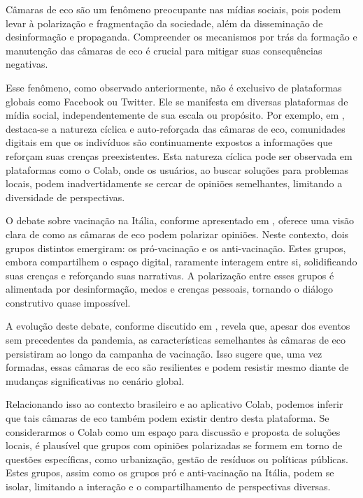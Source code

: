 Câmaras de eco são um fenômeno preocupante nas mídias sociais, pois podem levar à polarização e fragmentação da sociedade, além da disseminação de desinformação e propaganda. Compreender os mecanismos por trás da formação e manutenção das câmaras de eco é crucial para mitigar suas consequências negativas.

Esse fenômeno, como observado anteriormente, não é exclusivo de plataformas globais como Facebook ou Twitter. Ele se manifesta em diversas plataformas de mídia social, independentemente de sua escala ou propósito. Por exemplo, em , destaca-se a natureza cíclica e auto-reforçada das câmaras de eco, comunidades digitais em que os indivíduos são continuamente expostos a informações que reforçam suas crenças preexistentes. Esta natureza cíclica pode ser observada em plataformas como o Colab, onde os usuários, ao buscar soluções para problemas locais, podem inadvertidamente se cercar de opiniões semelhantes, limitando a diversidade de perspectivas.

O debate sobre vacinação na Itália, conforme apresentado em , oferece uma visão clara de como as câmaras de eco podem polarizar opiniões. Neste contexto, dois grupos distintos emergiram: os pró-vacinação e os anti-vacinação. Estes grupos, embora compartilhem o espaço digital, raramente interagem entre si, solidificando suas crenças e reforçando suas narrativas. A polarização entre esses grupos é alimentada por desinformação, medos e crenças pessoais, tornando o diálogo construtivo quase impossível.

A evolução deste debate, conforme discutido em , revela que, apesar dos eventos sem precedentes da pandemia, as características semelhantes às câmaras de eco persistiram ao longo da campanha de vacinação. Isso sugere que, uma vez formadas, essas câmaras de eco são resilientes e podem resistir mesmo diante de mudanças significativas no cenário global.

Relacionando isso ao contexto brasileiro e ao aplicativo Colab, podemos inferir que tais câmaras de eco também podem existir dentro desta plataforma. Se considerarmos o Colab como um espaço para discussão e proposta de soluções locais, é plausível que grupos com opiniões polarizadas se formem em torno de questões específicas, como urbanização, gestão de resíduos ou políticas públicas. Estes grupos, assim como os grupos pró e anti-vacinação na Itália, podem se isolar, limitando a interação e o compartilhamento de perspectivas diversas.

